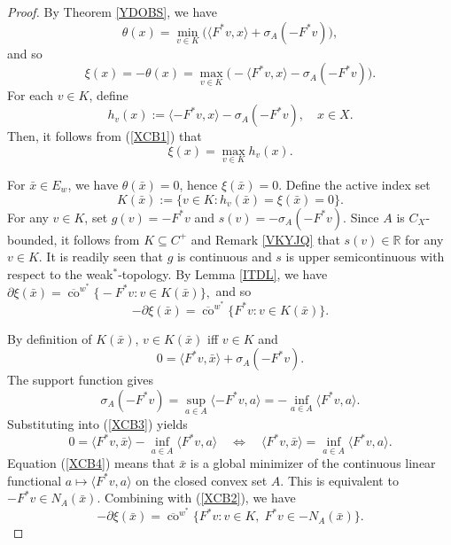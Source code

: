 \documentclass[11pt]{article}
\begin{document}
\begin{proof}
	By Theorem \ref{YDOBS}, we have
$$
	\theta(x) = \min_{v \in K} \bigl( \langle F^*v, x \rangle + \sigma_A(-F^*v) \bigr),  
$$
 and so 
\begin{equation}\label{XCB1}
	\xi(x) = -\theta(x) = \max_{v \in K} \bigl( -\langle F^*v, x \rangle - \sigma_A(-F^*v) \bigr).  
 \end{equation}
	For each $v \in K$, define
	\[
	h_v(x) := \langle -F^*v, x \rangle - \sigma_A(-F^*v), \quad x \in X.
	\]
	Then,  it follows from  (\ref{XCB1})  that
	\[
	\xi(x) = \max_{v \in K} h_v(x).
	\]
	
	For $\bar{x} \in E_w$, we have $\theta(\bar{x}) = 0$, hence $\xi(\bar{x}) = 0$. Define the active index set
	\[
	K(\bar{x}) := \{ v \in K : h_v(\bar{x}) = \xi(\bar{x}) = 0 \}.
	\]
		For any $v \in K$, set $g(v) = -F^*v$ and $s(v) = - \sigma_A(-F^*v)$.   Since $A$ is $C_X$-bounded, it follows from  $K \subseteq C^+$ and   Remark   \ref{VKYJQ}    that $s(v) \in \mathbb{R}$ for any $v \in K$.
		  It is readily seen that   $g$ is continuous   and   $s$ is upper semicontinuous with respect to the weak$^*$-topology.
		By Lemma \ref{ITDL}, we have
$	\partial \xi(\bar{x}) = \overline{\operatorname{co}}^{w^*} \bigl\{ -F^*v : v \in K(\bar{x}) \bigr\}, $
and so 
\begin{equation}\label{XCB2}
	- \partial \xi(\bar{x}) = \overline{\operatorname{co}}^{w^*} \bigl\{ F^*v : v \in K(\bar{x}) \bigr\}.  
 \end{equation}
	
	By definition of $K(\bar{x})$, $v \in K(\bar{x})$ iff $v \in K$ and
\begin{equation}\label{XCB3}
	0 = \langle F^*v, \bar{x} \rangle + \sigma_A(-F^*v).  
 \end{equation}
	The support function gives
	\[
	\sigma_A(-F^*v) = \sup_{a \in A} \langle -F^*v, a \rangle = - \inf_{a \in A} \langle F^*v, a \rangle.
	\]
	Substituting into  (\ref{XCB3}) yields
\begin{equation}\label{XCB4}
	0 = \langle F^*v, \bar{x} \rangle - \inf_{a \in A} \langle F^*v, a \rangle
	\quad \Longleftrightarrow \quad
	\langle F^*v, \bar{x} \rangle = \inf_{a \in A} \langle F^*v, a \rangle.  
 \end{equation}
		Equation (\ref{XCB4}) means that $\bar{x}$ is a global minimizer of the continuous linear functional $a \mapsto \langle F^*v, a \rangle$ on the closed convex set $A$. This is equivalent to
$	-F^*v \in N_A(\bar{x}).$
	Combining with (\ref{XCB2}), we have
\begin{equation}\label{XCB++}
	-\partial \xi(\bar{x}) = \overline{\operatorname{co}}^{w^*} \bigl\{ F^*v : v \in K,\; F^*v \in -N_A(\bar{x}) \bigr\}.
 \end{equation}
	

\end{proof}
\end{document}

